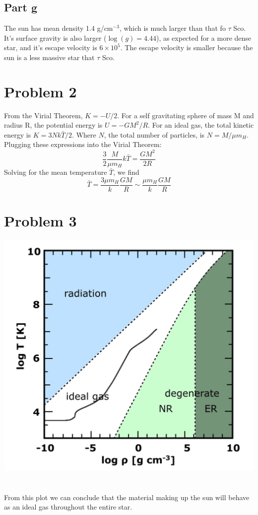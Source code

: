 \documentclass[a4paper, 11pt]{article}
\begin{document}
	\subsection*{Part g}
		The sun has mean density 1.4 g/cm$^{-3}$, which is much larger than that fo $\tau$ Sco. It's surface 
		gravity is also larger ($\log(g)=4.44$), as expected for a more dense star, and it's escape velocity is 
		$6\times10^5$. The escape velocity is smaller because the sun is a less massive star that $\tau$ Sco. 
		
\section*{Problem 2}
	From the Virial Theorem, $K = -U/2$. For a self gravitating sphere of mass M and radius R, the potential energy 
	is $U = -GM^2/R$. For an ideal gas, the total kinetic energy is $K = 3Nk\bar{T}/2$. Where $N$, the total number of 
	particles, is $N = M/\mu m_H$. Plugging these expressions into the Virial Theorem:
	\begin{equation*}
		\frac{3}{2}\frac{M}{\mu m_H}k\bar{T} = \frac{GM^2}{2R}
	\end{equation*}
	Solving for the mean temperature $\bar{T}$, we find 
	\begin{equation*}
		\bar{T} = \frac{3\mu m_H}{k}\frac{GM}{R} \sim \frac{\mu m_H}{k}\frac{GM}{R}
	\end{equation*}
\section*{Problem 3}
	\includegraphics[width=15cm]{problem3.png}
	\ \\ \\
	From this plot we can conclude that the material making up the sun will behave as an ideal gas throughout the 
	entire star. 
\end{document}
